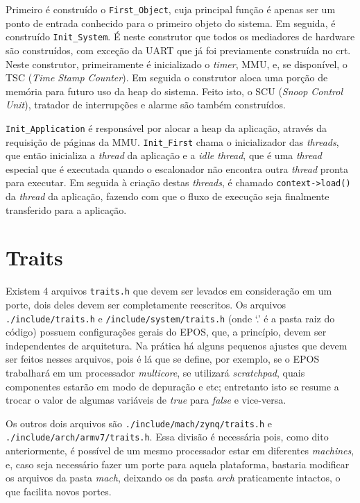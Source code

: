 
Primeiro é construído o \verb+First_Object+, cuja principal função é apenas ser um ponto de entrada conhecido para o primeiro objeto do sistema.
Em seguida, é construído \verb+Init_System+. É neste construtor que todos os mediadores de hardware são construídos, com exceção da UART que já foi previamente construída no crt. Neste construtor, primeiramente é inicializado o \emph{timer}, MMU, e, se disponível, o TSC (\emph{Time Stamp Counter}). Em seguida o construtor aloca uma porção de memória para futuro uso da heap do sistema. Feito isto, o SCU (\emph{Snoop Control Unit}), tratador de interrupções e alarme são também construídos.

\verb+Init_Application+ é responsável por alocar a heap da aplicação, através da requisição de páginas da MMU. \verb+Init_First+ chama o inicializador das \emph{threads}, que então inicializa a \emph{thread} da aplicação e a \emph{idle thread}, que é uma \emph{thread} especial que é executada quando o escalonador não encontra outra \emph{thread} pronta para executar. Em seguida à criação destas \emph{threads}, é chamado \verb+context->load()+ da \emph{thread} da aplicação, fazendo com que o fluxo de execução seja finalmente transferido para a aplicação.

\section{Traits}
\label{sec:traits}
Existem 4 arquivos \verb=traits.h= que devem ser levados em consideração em um porte, dois deles devem ser completamente reescritos. Os arquivos \verb+./include/traits.h+ e \verb+/include/system/traits.h+ (onde `.' é a pasta raiz do código) possuem configurações gerais do EPOS, que, a princípio, devem ser independentes de arquitetura. Na prática há alguns pequenos ajustes que devem ser feitos nesses arquivos, pois é lá que se define, por exemplo, se o EPOS trabalhará em um processador \emph{multicore}, se utilizará \emph{scratchpad}, quais componentes estarão em modo de depuração e etc; entretanto isto se resume a trocar o valor de algumas variáveis de \emph{true} para \emph{false} e vice-versa.

Os outros dois arquivos são \verb+./include/mach/zynq/traits.h+ e\\ \verb+./include/arch/armv7/traits.h+. Essa divisão é necessária pois, como dito anteriormente, é possível de um mesmo processador estar em diferentes \emph{machines}, e, caso seja necessário fazer um porte para aquela plataforma, bastaria modificar os arquivos da pasta \emph{mach}, deixando os da pasta \emph{arch} praticamente intactos, o que facilita novos portes.


